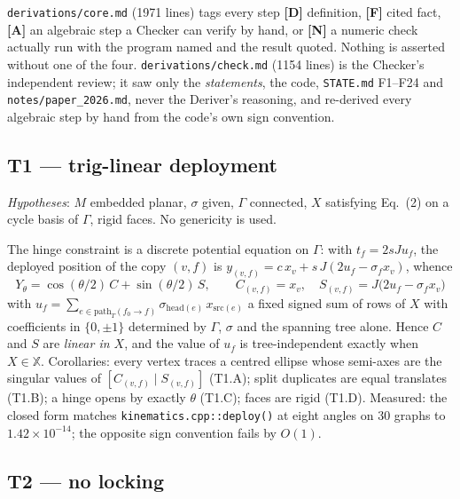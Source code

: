 \documentclass[10pt,a4paper]{article}
\newcommand{\fn}[1]{\nolinkurl{#1}}
\begin{document}
\fn{derivations/core.md} (1971 lines) tags every step \textbf{[D]} definition, \textbf{[F]}
cited fact, \textbf{[A]} an algebraic step a Checker can verify by hand, or \textbf{[N]} a
numeric check actually run with the program named and the result quoted. Nothing is asserted
without one of the four. \fn{derivations/check.md} (1154 lines) is the Checker's independent
review; it saw only the \emph{statements}, the code, \fn{STATE.md} F1--F24 and
\fn{notes/paper_2026.md}, never the Deriver's reasoning, and re-derived every algebraic step by
hand from the code's own sign convention.

\subsection{T1 --- trig-linear deployment}

\emph{Hypotheses}: $M$ embedded planar, $\sigma$ given, $\Gamma$ connected, $X$ satisfying
Eq.~(2) on a cycle basis of $\Gamma$, rigid faces. No genericity is used.

The hinge constraint is a discrete potential equation on $\Gamma$: with $t_f = 2sJu_f$, the
deployed position of the copy $(v,f)$ is $y_{(v,f)} = c\,x_v + s\,J(2u_f - \sigma_f x_v)$, whence
\[
\boxed{\;Y_\theta = \cos(\theta/2)\,C + \sin(\theta/2)\,S,\qquad
C_{(v,f)} = x_v,\quad S_{(v,f)} = J\big(2u_f - \sigma_f x_v\big)\;}
\tag{T1.5}
\]
with $u_f = \sum_{e\in \mathrm{path}_T(f_0\to f)} \sigma_{\mathrm{head}(e)}\,x_{\mathrm{src}(e)}$
a fixed signed sum of rows of $X$ with coefficients in $\{0,\pm1\}$ determined by $\Gamma$,
$\sigma$ and the spanning tree alone. Hence $C$ and $S$ are \emph{linear in $X$}, and the value
of $u_f$ is tree-independent exactly when $X\in\mathbb X$.
Corollaries: every vertex traces a centred ellipse whose semi-axes are the singular values of
$[C_{(v,f)} \mid S_{(v,f)}]$ (T1.A); split duplicates are equal translates (T1.B); a hinge opens
by exactly $\theta$ (T1.C); faces are rigid (T1.D).
Measured: the closed form matches \fn{kinematics.cpp::deploy()} at eight angles on 30 graphs to
$1.42\times10^{-14}$; the opposite sign convention fails by $O(1)$.

\subsection{T2 --- no locking}
\end{document}
